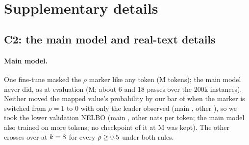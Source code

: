 \section{Supplementary details}
\label{sec:app}



\subsection{C2: the main model and real-text details}
\label{sec:c2-app}

\paragraph{Main model.}
One fine-tune masked the $\rho$ marker like any token (\CTwoAltFtTokensM{}M tokens); the main
model never did, as at evaluation (\CTwoFtTokensM{}M; about 6 and 18 passes over the 200k instances). Neither moved the mapped value's
probability by our bar of \CTwoMarkerBar{} when the marker is switched from $\rho=1$ to $0$
with only the leader observed (main \CTwoMarkerEffect, other \CTwoAltMarkerEffect), so we took the
lower validation NELBO (main \CTwoValNelbo, other \CTwoAltValNelbo{} nats per token; the main
model also trained on more tokens; no checkpoint of it at \CTwoAltFtTokensM{}M was kept). The other crosses over at
$k=8$ for every
$\rho\ge0.5$ under both rules.

